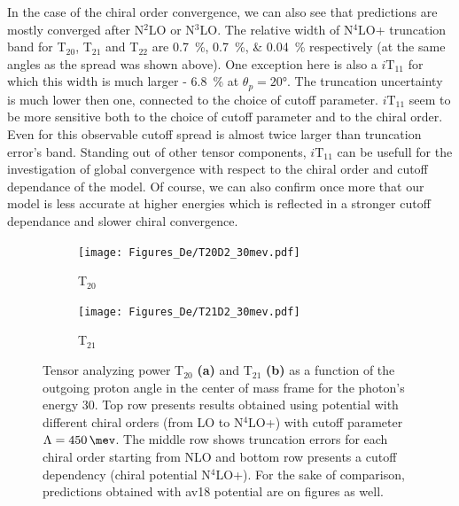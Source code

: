     In the case of the chiral order convergence, we can
    also see that predictions are mostly converged after N$^2$LO or N$^3$LO.
    The relative width of N$^4$LO+ truncation band 
    for T$_{20}$, T$_{21}$ and T$_{22}$
    are \SIlist{0.7; 0.7; 0.04}{\percent} respectively (at the same angles as the spread was shown above).
    One exception here is also a $i\text{T}_{11}$ for which this width is much larger - \SI{6.8}{\percent} at $\theta_p = \ang{20}$.
    The truncation uncertainty is much lower then one,
    connected to the choice of cutoff parameter.
    $i\text{T}_{11}$ seem to be more sensitive both
    to the choice of cutoff parameter and to the chiral order. Even for this observable cutoff spread is almost twice larger than truncation error's band.
    Standing out of other tensor components, $i\text{T}_{11}$ can be usefull for the investigation of global 
    convergence  with respect to the chiral order and cutoff dependance of the model.
    Of course, we can also confirm once more that 
    our model is less accurate at higher energies which is reflected
    in a stronger cutoff dependance and slower chiral convergence.


    \begin{figure}[htb]
        \centering
        \begin{subfigure}[b]{0.46\textwidth}
            \texttt{[image: Figures\_De/T20D2\_30mev.pdf]}
            \caption{T$_{20}$}
            \label{T20_30_vert}
        \end{subfigure}
        \begin{subfigure}[b]{0.46\textwidth}
            \texttt{[image: Figures\_De/T21D2\_30mev.pdf]}
            \caption{T$_{21}$}
            \label{T21_30_vert}
        \end{subfigure}
        \caption{Tensor analyzing power T$_{20}$  {\bf (a)}
        and T$_{21}$ {\bf (b)}
        as a function of the outgoing proton angle in the center of mass frame 
        for the photon's energy \SI{30}{\mev}.
        Top row presents results obtained using potential
        with different chiral orders (from LO to N$^4$LO+) with cutoff parameter $\Lambda=\SI{450}{\mev}$.
        The middle row shows truncation errors for each 
        chiral order starting from NLO and
        bottom row presents a cutoff dependency (chiral potential N$^4$LO+).
        For the sake of comparison, predictions obtained with \gls*{av18} potential are on figures as well.}
        \label{T20_T21_30}
    \end{figure}

